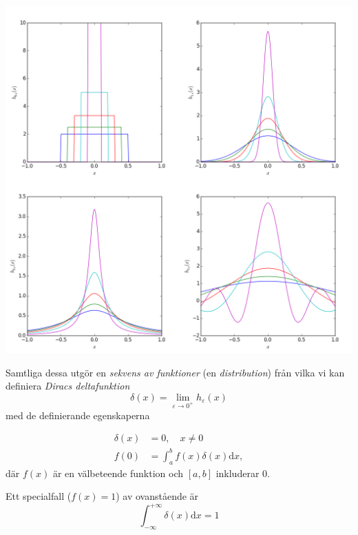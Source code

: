 \documentclass[%
oneside,                 %
final,                   %
10pt]{article}
\newenvironment{block_mdfboxadmon}[1][]{
\begin{block_mdfboxmdframed}[frametitle=#1]
}
{
\end{block_mdfboxmdframed}
}
\begin{document}
\vspace{6mm}

\centerline{\includegraphics[width=0.95\linewidth]{fig/deltas.png}}

\vspace{6mm}



Samtliga dessa utgör en \emph{sekvens av funktioner} (en \emph{distribution}) från vilka vi kan definiera \emph{Diracs deltafunktion}
\begin{equation}
\delta(x) = \lim_{\varepsilon \to 0^+} h_\varepsilon(x)
\end{equation}
med de definierande egenskaperna

\begin{block_mdfboxadmon}[]
\begin{align}
\delta(x) &= 0, \quad x \neq 0 \\ 
f(0) &= \int_a^b f(x) \delta(x) \mbox{d}x,
\end{align}
där $f(x)$ är en välbeteende funktion och $\left[ a,b \right]$ inkluderar 0.
\end{block_mdfboxadmon} %



Ett specialfall ($f(x)=1$) av ovanstående är
\begin{equation}
\int_{-\infty}^{+\infty} \delta(x) \mbox{d}x = 1
\end{equation}
\end{document}
